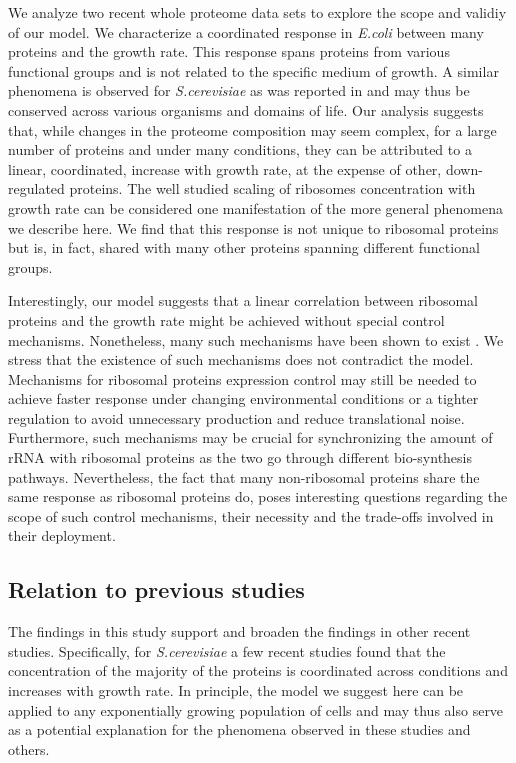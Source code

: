 \documentclass[a4paper]{article}
\begin{document}
We analyze two recent whole proteome data sets to explore the scope and validiy of our model.
We characterize a coordinated response in \emph{E.coli} between many proteins and the growth rate.
This response spans proteins from various functional groups and is not related to the specific medium of growth.
A similar phenomena is observed for \emph{S.cerevisiae} as was reported in \cite{Keren2013a} and may thus be conserved across various organisms and domains of life.
Our analysis suggests that, while changes in the proteome composition may seem complex, for a large number of proteins and under many conditions, they can be attributed to a linear, coordinated, increase with growth rate, at the expense of other, down-regulated proteins.
The well studied scaling of ribosomes concentration with growth rate can be considered one manifestation of the more general phenomena we describe here.
We find that this response is not unique to ribosomal proteins but is, in fact, shared with many other proteins spanning different functional groups.

Interestingly, our model suggests that a linear correlation between ribosomal proteins and the growth rate might be achieved without special control mechanisms.
Nonetheless, many such mechanisms have been shown to exist \cite{Nomura1984}.
We stress that the existence of such mechanisms does not contradict the model.
Mechanisms for ribosomal proteins expression control may still be needed to achieve faster response under changing environmental conditions or a tighter regulation to avoid unnecessary production and reduce translational noise.
Furthermore, such mechanisms may be crucial for synchronizing the amount of rRNA with ribosomal proteins as the two go through different bio-synthesis pathways.
Nevertheless, the fact that many non-ribosomal proteins share the same response as ribosomal proteins do, poses interesting questions regarding the scope of such control mechanisms, their necessity and the trade-offs involved in their deployment.

\subsection{Relation to previous studies}
The findings in this study support and broaden the findings in other recent studies.
Specifically, for \emph{S.cerevisiae} a few recent studies found that the concentration of the majority of the proteins is coordinated across conditions \cite{Keren2013a,Gasch2000,Brauer2008a} and increases with growth rate.
In principle, the model we suggest here can be applied to any exponentially growing population of cells and may thus also serve as a potential explanation for the phenomena observed in these studies and others.
\end{document}
